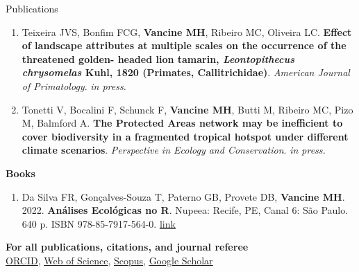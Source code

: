 \documentclass{resume}
\begin{document}
\begin{rSection}{Publications}
\begin{enumerate}
\item Teixeira JVS, Bonfim FCG, {\bf Vancine MH}, Ribeiro MC, Oliveira LC. {\bf Effect
of landscape attributes at multiple scales on the occurrence of the threatened golden-
headed lion tamarin, \textbf{\textit{Leontopithecus chrysomelas}} Kuhl, 1820 (Primates, Callitrichidae)}.
{\it American Journal of Primatology}. {\it in press.}

\item Tonetti V, Bocalini F, Schunck F, {\bf Vancine MH}, Butti M, Ribeiro MC, Pizo M, Balmford A. {\bf The Protected Areas network may be inefficient to cover biodiversity in a fragmented tropical hotspot under different climate scenarios}. {\it Perspective in Ecology and
Conservation}. {\it in press.}

\end{enumerate} 

{\bf Books}

\begin{enumerate} 
\item Da Silva FR, Gonçalves-Souza T, Paterno GB, Provete DB, {\bf Vancine MH}. 2022. {\bf Análises Ecológicas no R}. Nupeea: Recife, PE, Canal 6: São Paulo. 640 p. ISBN 978-85-7917-564-0. \href{https://analises-ecologicas.com/}{\underline{link}}
\end{enumerate} 

{\bf For all publications, citations, and journal referee}
\\ \href{https://orcid.org/0000-0001-9650-7575}{\underline{ORCID}}, \href{https://www.webofscience.com/wos/author/record/837504}{\underline{Web of Science}}, \href{https://www.scopus.com/authid/detail.uri?authorId=57193451888}{\underline{Scopus}}, \href{https://scholar.google.com/citations?user=i-2xZBQAAAAJ}{\underline{Google Scholar}}

\end{rSection}

\end{document}
